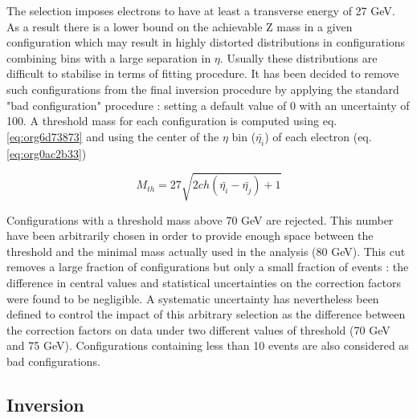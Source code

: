 The selection imposes electrons to have at least a transverse energy of 27 GeV.
As a result there is a lower bound on the achievable Z mass in a given configuration which may result in highly distorted distributions in configurations combining bins with a large separation in $\eta$.
Usually these distributions are difficult to stabilise in terms of fitting procedure.
It has been decided to remove such configurations from the final inversion procedure by applying the standard "bad configuration" procedure : setting a default value of 0 with an uncertainty of 100.
A threshold mass for each configuration is computed using eq. \ref{eq:org6d73873} and using the center of the $\eta$ bin (\(\bar{\eta_i}\)) of each electron (eq. \ref{eq:org0ac2b33})

\begin{equation}
\label{eq:org0ac2b33}
M_{th} = 27\sqrt{2 ch(\bar{\eta_i} - \bar{\eta_j}) + 1 }
\end{equation}

Configurations with a threshold mass above 70 GeV are rejected.
This number have been arbitrarily chosen in order to provide enough space between the threshold and the minimal mass actually used in the analysis (80 GeV).
This cut removes a large fraction of configurations but only a small fraction of events : the difference in central values and statistical uncertainties on the correction factors were found to be negligible.
A systematic uncertainty has nevertheless been defined to control the impact of this arbitrary selection as the difference between the correction factors on data under two different values of threshold (70 GeV and 75 GeV).
Configurations containing less than 10 events are also considered as bad configurations.

\subsection{Inversion}
\label{sec:org4b5e4aa}

